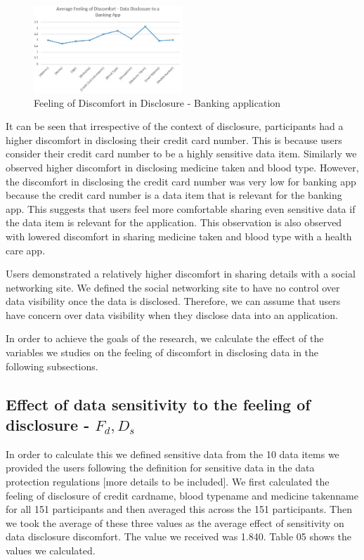 \documentclass[conference]{IEEEtran}
\begin{document}
\begin{figure}[h]
\begin{center}
\includegraphics[width=0.5\textwidth]{Average_Banking}
\caption{Feeling of Discomfort in Disclosure - Banking application}
\end{center}
\end{figure}

It can be seen that irrespective of the context of disclosure, participants had a higher discomfort in disclosing their credit card number. This is because users consider their credit card number to be a highly sensitive data item.  Similarly we observed higher discomfort in disclosing medicine taken and blood type. However, the discomfort in disclosing the credit card number was very low for banking app because the credit card number is a data item that is relevant for the banking app. This suggests that users feel more comfortable sharing even sensitive data if the data item is relevant for the application. This observation is also observed with lowered discomfort in sharing medicine taken and blood type with a health care app.

Users demonstrated a relatively higher discomfort in sharing details with a social networking site. We defined the social networking site to have no control over data visibility once the data is disclosed. Therefore, we can assume that users have concern over data visibility when they disclose data into an application. 

In order to achieve the goals of the research, we calculate the effect of the variables we studies on the feeling of discomfort in disclosing data in the following subsections.

\subsection{Effect of data sensitivity to the feeling of disclosure -  $F_d,D_s$}

In order to calculate this we defined sensitive data from the 10 data items we provided the users following the definition for sensitive data in the data protection regulations [more details to be included]. We first calculated the feeling of disclosure of credit card\/name, blood type\/name and medicine taken\/name for all 151 participants and then averaged this across the 151 participants. Then we took the average of these three values as the average effect of sensitivity on data disclosure discomfort. The value we received was 1.840. Table 05 shows the values we calculated.
\end{document}
